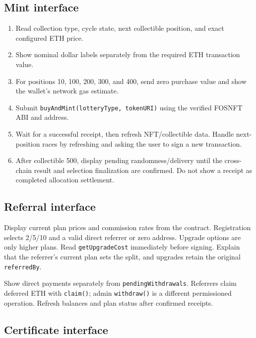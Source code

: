 \documentclass[
  10pt,
  letterpaper,
]{article}
\providecommand{\tightlist}{%
  \setlength{\itemsep}{0pt}\setlength{\parskip}{0pt}}
\begin{document}
\subsection{Mint interface}\label{mint-interface}

\begin{enumerate}
\def\labelenumi{\arabic{enumi}.}
\tightlist
\item
  Read collection type, cycle state, next collectible position, and
  exact configured ETH price.
\item
  Show nominal dollar labels separately from the required ETH
  transaction value.
\item
  For positions 10, 100, 200, 300, and 400, send zero purchase value and
  show the wallet's network gas estimate.
\item
  Submit \texttt{buyAndMint(lotteryType,\ tokenURI)} using the verified
  FOSNFT ABI and address.
\item
  Wait for a successful receipt, then refresh NFT/collectible data.
  Handle next-position races by refreshing and asking the user to sign a
  new transaction.
\item
  After collectible 500, display pending randomness/delivery until the
  cross-chain result and selection finalization are confirmed. Do not
  show a receipt as completed allocation settlement.
\end{enumerate}

\subsection{Referral interface}\label{referral-interface}

Display current plan prices and commission rates from the contract.
Registration selects 2/5/10 and a valid direct referrer or zero address.
Upgrade options are only higher plans. Read \texttt{getUpgradeCost}
immediately before signing. Explain that the referrer's current plan
sets the split, and upgrades retain the original \texttt{referredBy}.

Show direct payments separately from \texttt{pendingWithdrawals}.
Referrers claim deferred ETH with \texttt{claim()}; admin
\texttt{withdraw()} is a different permissioned operation. Refresh
balances and plan status after confirmed receipts.

\subsection{Certificate interface}\label{certificate-interface}
\end{document}
